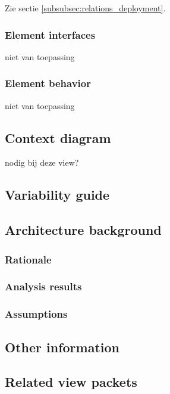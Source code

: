 \documentclass[a4paper,10pt]{paper}
\begin{document}
Zie sectie \ref{subsubsec:relations_deployment}.

\subsubsection{Element interfaces}

niet van toepassing

\subsubsection{Element behavior}

niet van toepassing

\subsection{Context diagram}

nodig bij deze view?

\subsection{Variability guide}

\subsection{Architecture background}

\subsubsection{Rationale}



\subsubsection{Analysis results}

\subsubsection{Assumptions}

\subsection{Other information}

\subsection{Related view packets}
\end{document}
